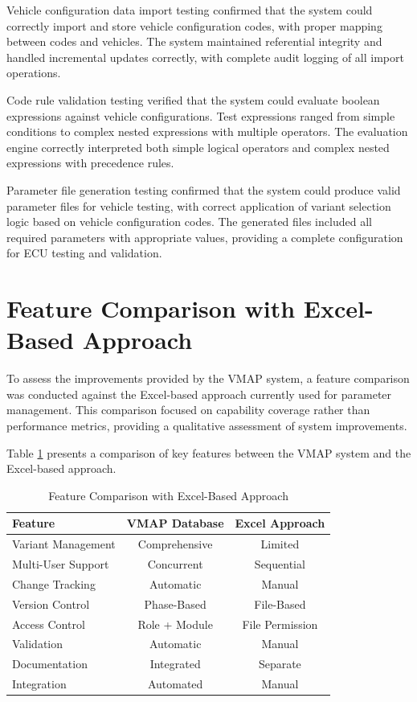 Vehicle configuration data import testing confirmed that the system could correctly import and store vehicle configuration codes, with proper mapping between codes and vehicles. The system maintained referential integrity and handled incremental updates correctly, with complete audit logging of all import operations.

Code rule validation testing verified that the system could evaluate boolean expressions against vehicle configurations. Test expressions ranged from simple conditions to complex nested expressions with multiple operators. The evaluation engine correctly interpreted both simple logical operators and complex nested expressions with precedence rules.

Parameter file generation testing confirmed that the system could produce valid parameter files for vehicle testing, with correct application of variant selection logic based on vehicle configuration codes. The generated files included all required parameters with appropriate values, providing a complete configuration for \ac{ECU} testing and validation.

\section{Feature Comparison with Excel-Based Approach}
\label{sec:feature-comparison-excel}

To assess the improvements provided by the \ac{VMAP} system, a feature comparison was conducted against the Excel-based approach currently used for parameter management. This comparison focused on capability coverage rather than performance metrics, providing a qualitative assessment of system improvements.

Table \ref{tab:feature-comparison} presents a comparison of key features between the \ac{VMAP} system and the Excel-based approach.

\begin{table}[h]
\centering
\caption{Feature Comparison with Excel-Based Approach}
\label{tab:feature-comparison}
\begin{tabular}{|l|c|c|}
\hline
\textbf{Feature} & \textbf{VMAP Database} & \textbf{Excel Approach} \\
\hline
Variant Management & Comprehensive & Limited \\
\hline
Multi-User Support & Concurrent & Sequential \\
\hline
Change Tracking & Automatic & Manual \\
\hline
Version Control & Phase-Based & File-Based \\
\hline
Access Control & Role + Module & File Permission \\
\hline
Validation & Automatic & Manual \\
\hline
Documentation & Integrated & Separate \\
\hline
Integration & Automated & Manual \\
\hline
\end{tabular}
\end{table}

